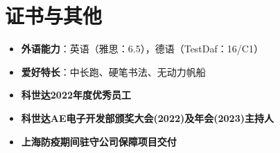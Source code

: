 \documentclass[11pt,a4paper]{ctexart}
\begin{document}
\section*{证书与其他}

\begin{itemize}
  \item \textbf{外语能力}：英语（雅思：6.5），德语（TestDaf：16/C1）
  \item \textbf{爱好特长}：中长跑、硬笔书法、无动力帆船
  \item \textbf{科世达2022年度优秀员工}
  \item \textbf{科世达AE电子开发部颁奖大会(2022)及年会(2023)主持人}
  \item \textbf{上海防疫期间驻守公司保障项目交付}
\end{itemize}
\end{document}
